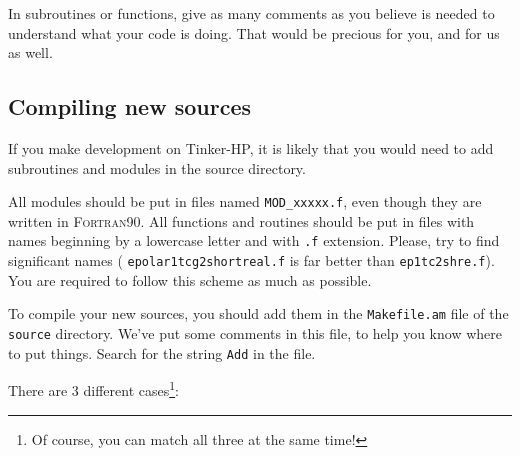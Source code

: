 \documentclass[peerreview]{IEEEtran}
\begin{document}
In subroutines or functions, give as many comments as you believe is needed to understand what your code is doing. That would be precious for you, and for us as well. 
\subsection{Compiling new sources}
If you make development on Tinker-HP, it is likely that you would need to add subroutines and modules in the source directory.

All modules should be put in files named \texttt{MOD\_xxxxx.f}, even though they are written in \textsc{Fortran90}. All functions and routines should be put in files with names beginning by a lowercase letter and with \texttt{.f} extension. Please, try to find significant names ( \texttt{epolar1tcg2shortreal.f} is far better than \texttt{ep1tc2shre.f}). You are required to follow this scheme as much as possible.

To compile your new sources, you should add them in the \texttt{Makefile.am} file of the \texttt{source} directory. We've put some comments in this file, to help you know where to put things. Search for the string \texttt{Add} in the file. 

There are 3 different cases\footnote{Of course, you can match all three at the same time!}:
\end{document}
